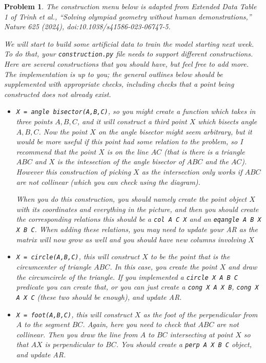 \documentclass{article}
\newtheorem{problem}{Problem}
\begin{document}
\begin{problem}
The construction menu below is adapted from Extended Data Table 1 of Trinh et
al., ``Solving olympiad geometry without human demonstrations,'' \emph{Nature}
625 (2024), doi:10.1038/s41586-023-06747-5.

We will start to build some artificial data to train the model starting next
week. To do that, your \verb|construction.py| file needs to support different
constructions. Here are several constructions that you should have, but feel
free to add more. The implementation is up to you; the general outlines below
should be supplemented with appropriate checks, including checks that a point
being constructed does not already exist.

\begin{itemize}
    \item \verb|X = angle bisector(A,B,C)|, so you might create a function which takes in three points $A,B,C$, and it will construct a third point $X$ which bisects angle $A,B,C$. Now the point $X$ on the angle bisector might seem arbitrary, but it would be more useful if this point had some relation to the problem, so I recommend that the point $X$ is on the line $AC$ (that is there is a triangle $ABC$ and $X$ is the intesection of the angle bisector of $ABC$ and the $AC$). However this construction of picking $X$ as the intersection only works if $ABC$ are not collinear (which you can check using the diagram). 

    When you do this construction, you should namely create the point object $X$ with its coordinates and everything in the picture, and then you should create the corresponding relations this should be a \verb|col A C X| and an \verb|eqangle A B X X B C|. When adding these relations, you may need to update your AR as the matrix will now grow as well and you should have new columns involving $X$

    \item \verb|X = circle(A,B,C)|, this will construct $X$ to be the point that is the circumcenter of triangle $ABC$. In this case, you create the point $X$ and draw the circumcircle of the triangle. If you implemented a \verb|circle X A B C| predicate you can create that, or you can just create a \verb|cong X A X B|, \verb|cong X A X C| (these two should be enough), and update AR. 

    \item \verb|X = foot(A,B,C)|, this will construct $X$ as the foot of the perpendicular from $A$ to the segment $BC$. Again, here you need to check that $ABC$ are not collinear. Then you draw the line from $A$ to $BC$ intersecting at point $X$ so that $AX$ is perpendicular to $BC$. You should create a \verb|perp A X B C| object, and update AR. 


\end{itemize}
\end{problem}
\end{document}
